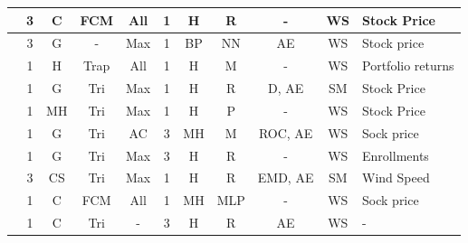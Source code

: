 \begin{center}
\begin{landscape}
\begin{longtable}[c]{|m{4cm}|c|c|c|c|c|c|c|c|c|m{5cm}|}
\cite{Sun2015}             & 3                  & C            & FCM         & All                    & 1              & H                       & R                & -                        & WS            & Stock Price           \\ \hline
\cite{Singh2015}           & 3                  & G                  & -           & Max                & 1              & BP                             & NN                 & AE             & WS            & Stock price           \\ \hline
\cite{Rubio2016}           & 1                  & H             & Trap & All                    & 1              & H                       & M              & -                        & WS            & Portfolio returns     \\ \hline
\cite{Sadaei2016}          & 1                  & G                  & Tri  & Max                & 1              & H                       & R               & D, AE           & SM              & Stock Price           \\ \hline
\cite{Talarposhti2016a}    & 1                  & MH         & Tri  & Max                & 1              & H                       & P  & -                        & WS            & Stock Price           \\ \hline
\cite{Ye2016}              & 1                  & G                  & Tri  & AC              & 3              & MH                         & M              & ROC, AE            & WS            & Sock price            \\ \hline
\cite{Lee2017}             & 1                  & G                  & Tri  & Max                & 3              & H                     & R               & -                        & WS            & Enrollments           \\ \hline
\cite{Yang2017}            & 3                  & CS            & Tri  & Max                & 1              & H                       & R               & EMD, AE            & SM              & Wind Speed            \\ \hline
\cite{Yolcu2017}           & 1                  & C            & FCM         & All                    & 1              & MH                             & MLP                 & -                        & WS            & Sock price            \\ \hline
\cite{Bose2017}            & 1                  & C            & Tri  & -                      & 3              & H                       & R                & AE                 & WS            & -                     \\ \hline

\end{longtable}
\end{landscape}
\end{center}
